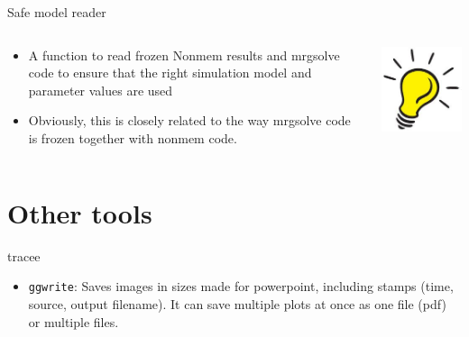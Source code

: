 \documentclass[
  8pt,
  ignorenonframetext,
  aspectratio=169]{beamer}
\providecommand{\tightlist}{%
  \setlength{\itemsep}{0pt}\setlength{\parskip}{0pt}}
\begin{document}
\begin{frame}{Safe model reader}
\protect\hypertarget{safe-model-reader}{}
\begin{columns}[T]
\begin{column}{0.85\textwidth}
\begin{itemize}
\item
  A function to read frozen Nonmem results and mrgsolve code to ensure
  that the right simulation model and parameter values are used
\item
  Obviously, this is closely related to the way mrgsolve code is frozen
  together with nonmem code.
\end{itemize}
\end{column}

\begin{column}{0.15\textwidth}
\includegraphics[width=.5in]{figures/ideabulb.jpg}
\end{column}
\end{columns}
\end{frame}

\hypertarget{other-tools}{%
\section{Other tools}\label{other-tools}}

\begin{frame}[fragile]{tracee}
\protect\hypertarget{tracee}{}
\begin{itemize}
\tightlist
\item
  \texttt{ggwrite}: Saves images in sizes made for powerpoint, including
  stamps (time, source, output filename). It can save multiple plots at
  once as one file (pdf) or multiple files.
\end{itemize}
\end{frame}
\end{document}
